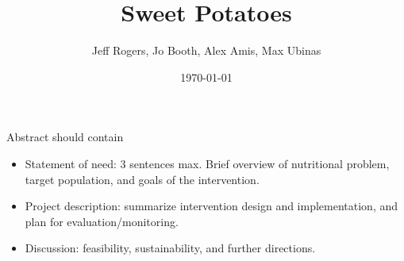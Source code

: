 \documentclass[12pt, letterpaper, draft]{article}
\begin{document}
\title{Sweet Potatoes}
\author{Jeff Rogers, Jo Booth, Alex Amis, Max Ubinas}
\date{\today}
\maketitle

\thispagestyle{empty}
\pagestyle{empty}
Abstract should contain
\begin{itemize}
    \item Statement of need: 3 sentences max. Brief overview of nutritional
    problem, target population, and goals of the intervention.
    \item Project description: summarize intervention design and implementation,
    and plan for evaluation/monitoring.
    \item Discussion: feasibility, sustainability, and further directions.
\end{itemize}
\end{document}
